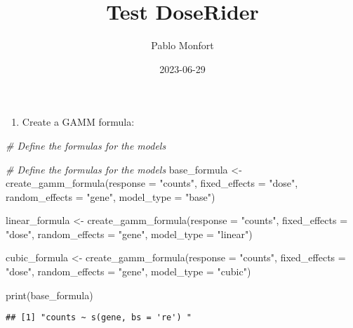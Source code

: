 \documentclass[
]{article}
\title{Test DoseRider}
\author{Pablo Monfort}
\date{2023-06-29}
\newenvironment{Shaded}{\begin{snugshade}}{\end{snugshade}}
\newcommand{\AttributeTok}[1]{\textcolor[rgb]{0.77,0.63,0.00}{#1}}
\newcommand{\CommentTok}[1]{\textcolor[rgb]{0.56,0.35,0.01}{\textit{#1}}}
\newcommand{\FunctionTok}[1]{\textcolor[rgb]{0.00,0.00,0.00}{#1}}
\newcommand{\NormalTok}[1]{#1}
\newcommand{\OtherTok}[1]{\textcolor[rgb]{0.56,0.35,0.01}{#1}}
\newcommand{\StringTok}[1]{\textcolor[rgb]{0.31,0.60,0.02}{#1}}
\providecommand{\tightlist}{%
  \setlength{\itemsep}{0pt}\setlength{\parskip}{0pt}}
\begin{document}
\maketitle

\begin{enumerate}
\def\labelenumi{\arabic{enumi}.}
\tightlist
\item
  Create a GAMM formula:
\end{enumerate}

\begin{Shaded}
\begin{Highlighting}[]
\CommentTok{\# Define the formulas for the models}

\CommentTok{\# Define the formulas for the models}
\NormalTok{base\_formula }\OtherTok{\textless{}{-}} \FunctionTok{create\_gamm\_formula}\NormalTok{(}\AttributeTok{response =} \StringTok{"counts"}\NormalTok{,}
                                    \AttributeTok{fixed\_effects =} \StringTok{"dose"}\NormalTok{,}
                                    \AttributeTok{random\_effects =} \StringTok{"gene"}\NormalTok{,}
                                    \AttributeTok{model\_type =} \StringTok{"base"}\NormalTok{)}

\NormalTok{linear\_formula }\OtherTok{\textless{}{-}} \FunctionTok{create\_gamm\_formula}\NormalTok{(}\AttributeTok{response =} \StringTok{"counts"}\NormalTok{,}
                                      \AttributeTok{fixed\_effects =} \StringTok{"dose"}\NormalTok{,}
                                      \AttributeTok{random\_effects =} \StringTok{"gene"}\NormalTok{,}
                                      \AttributeTok{model\_type =} \StringTok{"linear"}\NormalTok{)}

\NormalTok{cubic\_formula }\OtherTok{\textless{}{-}} \FunctionTok{create\_gamm\_formula}\NormalTok{(}\AttributeTok{response =} \StringTok{"counts"}\NormalTok{,}
                                     \AttributeTok{fixed\_effects =} \StringTok{"dose"}\NormalTok{,}
                                     \AttributeTok{random\_effects =} \StringTok{"gene"}\NormalTok{,}
                                     \AttributeTok{model\_type =} \StringTok{"cubic"}\NormalTok{)}

\FunctionTok{print}\NormalTok{(base\_formula)}
\end{Highlighting}
\end{Shaded}

\begin{verbatim}
## [1] "counts ~ s(gene, bs = 're') "
\end{verbatim}
\end{document}
